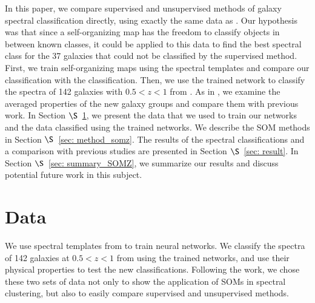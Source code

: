 In this paper, we compare supervised and unsupervised methods of galaxy spectral classification directly, using exactly the same data as .  
Our hypothesis was that since a self-organizing map has the freedom to classify objects in between known classes, it could be applied to this data 
to find the best spectral class for the 37 galaxies that could not be classified by the supervised method.
First, we train self-organizing maps using the  spectral templates and compare our classification with the  classification.
Then, we use the trained network to classify the spectra of 142 galaxies with $0.5 < z < 1$ from . 
As in , we examine the averaged properties of the new galaxy groups and compare them with previous work.
In Section $\S$~\ref{sec: data_highZ}, we present the data that we used to train our networks and the data classified using the trained networks. 
We describe the SOM methods in Section $\S$~\ref{sec: method_somz}. 
The results of the spectral classifications and a comparison with previous studies are presented in Section $\S$~\ref{sec: result}. 
In Section $\S$~\ref{sec: summary_SOMZ}, we summarize our results and discuss potential future work in this subject.

\section{Data}
\label{sec: data_highZ}
We use spectral templates from  to train neural networks. 
We classify the spectra of 142 galaxies at $0.5<z<1$ from  using the trained networks, and use their physical properties to test the new classifications.
Following the  work, we chose these two sets of data not only to show the application of SOMs in spectral clustering, but also to easily compare supervised and unsupervised methods.


